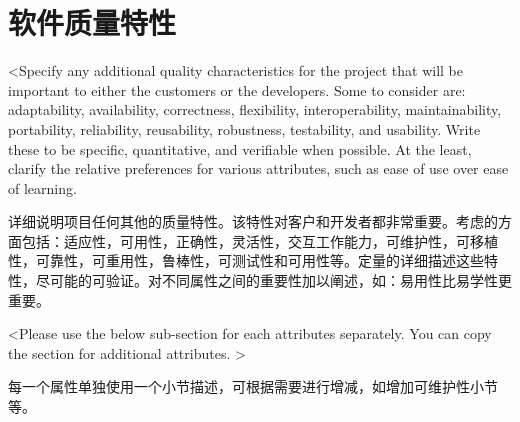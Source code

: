 \chapter{软件质量特性}
<Specify any additional quality characteristics for the project that will be important to either the customers or the developers. Some to consider are: adaptability, availability, correctness, flexibility, interoperability, maintainability, portability, reliability, reusability, robustness, testability, and usability. Write these to be specific, quantitative, and verifiable when possible. At the least, clarify the relative preferences for various attributes, such as ease of use over ease of learning.

详细说明项目任何其他的质量特性。该特性对客户和开发者都非常重要。考虑的方面包括：适应性，可用性，正确性，灵活性，交互工作能力，可维护性，可移植性，可靠性，可重用性，鲁棒性，可测试性和可用性等。定量的详细描述这些特性，尽可能的可验证。对不同属性之间的重要性加以阐述，如：易用性比易学性更重要。

<Please use the below sub-section for each attributes separately. You can copy the section for additional attributes. >

每一个属性单独使用一个小节描述，可根据需要进行增减，如增加可维护性小节等。
